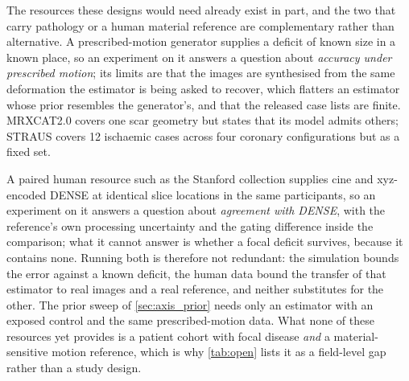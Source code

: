 The resources these designs would need already exist in part, and the two that carry pathology or a
human material reference are complementary rather than alternative. A prescribed-motion generator
supplies a deficit of known size in a known place, so an experiment on it answers a question about
\emph{accuracy under prescribed motion}; its limits are that the images are synthesised from the
same deformation the estimator is being asked to recover, which flatters an estimator whose prior
resembles the generator's, and that the released case lists are finite. MRXCAT2.0 covers one scar
geometry but states that its model admits others; STRAUS covers 12 ischaemic cases across four
coronary configurations but as a fixed set.

A paired human resource such as the Stanford collection
supplies cine and xyz-encoded DENSE at identical slice locations in the same participants, so an
experiment on it answers a question about \emph{agreement with DENSE}, with the reference's own
processing uncertainty and the gating difference inside the comparison; what it cannot answer is
whether a focal deficit survives, because it contains none. Running both is therefore not redundant:
the simulation bounds the error against a known deficit, the human data bound the transfer of that
estimator to real images and a real reference, and neither substitutes for the other. The prior
sweep of \cref{sec:axis_prior} needs only an estimator with an exposed control and the same
prescribed-motion data. What none of these resources yet provides is a patient cohort with focal
disease \emph{and} a material-sensitive motion reference, which is why \cref{tab:open} lists it as a
field-level gap rather than a study design.

